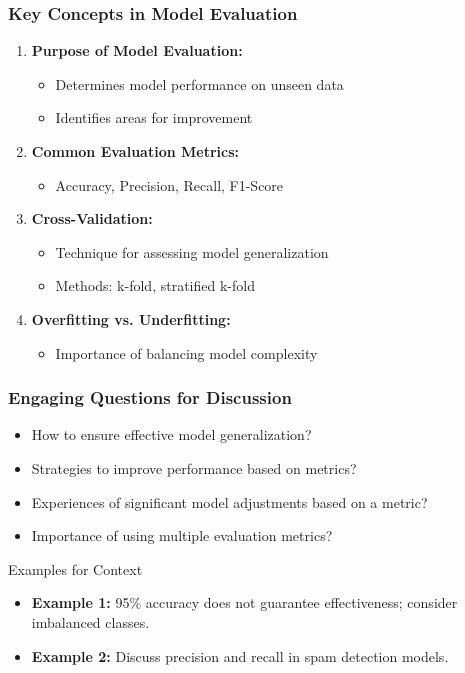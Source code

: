 \documentclass[aspectratio=169]{beamer}
\begin{document}
\begin{frame}[fragile]
    \frametitle{Key Concepts in Model Evaluation}
    \begin{enumerate}
        \item \textbf{Purpose of Model Evaluation:}
        \begin{itemize}
            \item Determines model performance on unseen data
            \item Identifies areas for improvement
        \end{itemize}
        
        \item \textbf{Common Evaluation Metrics:}
        \begin{itemize}
            \item Accuracy, Precision, Recall, F1-Score
        \end{itemize}
        
        \item \textbf{Cross-Validation:}
        \begin{itemize}
            \item Technique for assessing model generalization
            \item Methods: k-fold, stratified k-fold
        \end{itemize}
        
        \item \textbf{Overfitting vs. Underfitting:}
        \begin{itemize}
            \item Importance of balancing model complexity
        \end{itemize}
    \end{enumerate}
\end{frame}

\begin{frame}[fragile]
    \frametitle{Engaging Questions for Discussion}
    \begin{itemize}
        \item How to ensure effective model generalization?
        \item Strategies to improve performance based on metrics?
        \item Experiences of significant model adjustments based on a metric?
        \item Importance of using multiple evaluation metrics?
    \end{itemize}

    \begin{block}{Examples for Context}
        \begin{itemize}
            \item \textbf{Example 1:} 95\% accuracy does not guarantee effectiveness; consider imbalanced classes.
            \item \textbf{Example 2:} Discuss precision and recall in spam detection models.
        \end{itemize}
    \end{block}
\end{frame}
\end{document}
